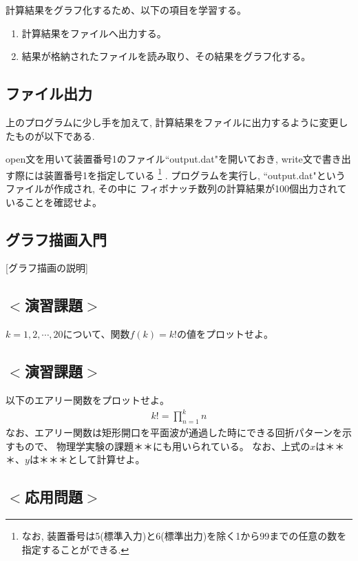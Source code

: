 計算結果をグラフ化するため、以下の項目を学習する。
\begin{enumerate}
	\item 計算結果をファイルへ出力する。
	\item 結果が格納されたファイルを読み取り、その結果をグラフ化する。
\end{enumerate}

\subsection*{ファイル出力}
上のプログラムに少し手を加えて, 計算結果をファイルに出力するように変更したものが以下である.

open文を用いて装置番号1のファイル``output.dat"を開いておき,
write文で書き出す際には装置番号1を指定している
\footnote{
  なお, 装置番号は5(標準入力)と6(標準出力)を除く1から99までの任意の数を指定することができる.
}
.
プログラムを実行し, ``output.dat"というファイルが作成され, その中に
フィボナッチ数列の計算結果が100個出力されていることを確認せよ。
\\


\subsection*{グラフ描画入門}
[グラフ描画の説明]

\subsection*{$<$演習課題$>$}
$k=1,2, \cdots, 20$について、関数$f(k) = k!$の値をプロットせよ。

\subsection*{$<$演習課題$>$}
以下のエアリー関数をプロットせよ。
\begin{eqnarray}
k! = \prod_{n=1}^{k} n
\end{eqnarray}
なお、エアリー関数は矩形開口を平面波が通過した時にできる回折パターンを示すもので、
物理学実験の課題＊＊にも用いられている。
なお、上式の$x$は＊＊＊、$y$は＊＊＊として計算せよ。

\subsection*{$<$応用問題$>$}
